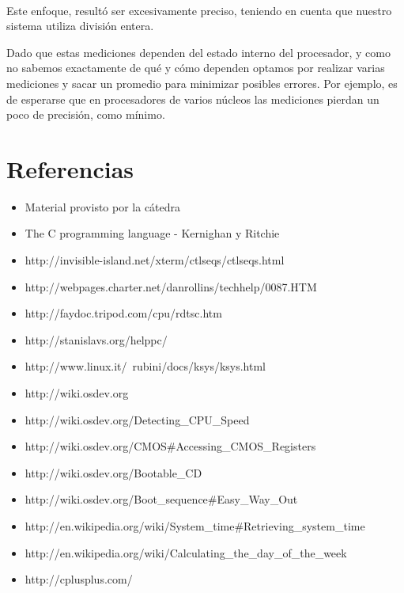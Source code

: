 \documentclass[a4paper,10pt]{article}
\begin{document}
    \paragraph*{}   
    Este enfoque, resultó ser excesivamente preciso, teniendo en cuenta que nuestro sistema utiliza división entera.

    Dado que estas mediciones dependen del estado interno del procesador, y como no sabemos exactamente de qué y cómo dependen optamos por realizar varias mediciones
    y sacar un promedio para minimizar posibles errores. Por ejemplo, es de esperarse que en procesadores de varios núcleos las mediciones
    pierdan un poco de precisión, como mínimo.

\newpage     
\section{Referencias}

\begin{itemize}
  \item Material provisto por la cátedra
  \item The C programming language - Kernighan y Ritchie
  \item http://invisible-island.net/xterm/ctlseqs/ctlseqs.html
  \item http://webpages.charter.net/danrollins/techhelp/0087.HTM
  \item http://faydoc.tripod.com/cpu/rdtsc.htm
  \item http://stanislavs.org/helppc/
  \item http://www.linux.it/~rubini/docs/ksys/ksys.html
  \item http://wiki.osdev.org
  \item http://wiki.osdev.org/Detecting\_CPU\_Speed
  \item	http://wiki.osdev.org/CMOS\#Accessing\_CMOS\_Registers
  \item http://wiki.osdev.org/Bootable\_CD
  \item http://wiki.osdev.org/Boot\_sequence\#Easy\_Way\_Out
  \item http://en.wikipedia.org/wiki/System\_time\#Retrieving\_system\_time
  \item http://en.wikipedia.org/wiki/Calculating\_the\_day\_of\_the\_week
  \item http://cplusplus.com/

\end{itemize}
   
\end{document}
